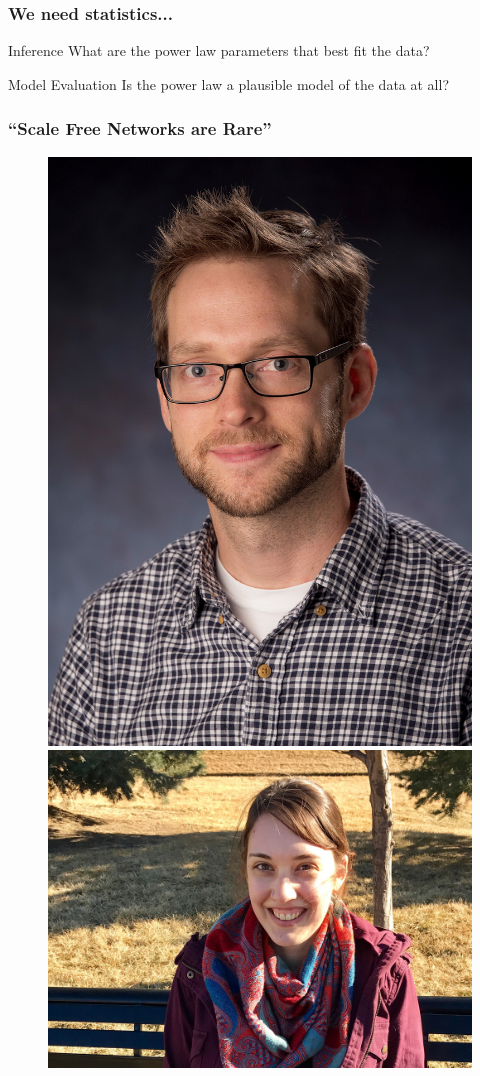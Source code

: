 \documentclass{beamer}
\begin{document}
		
		\begin{frame}\frametitle{We need statistics...}
		  	\begin{block}{Inference}
		  		What are the power law parameters that best fit the data? 
		  	\end{block}
		  	\begin{block}{Model Evaluation}
		  		Is the power law a plausible model of the data at all?
		  	\end{block}
		\end{frame}
	
		
		\begin{frame}\frametitle{``Scale Free Networks are Rare''}
		  	\begin{figure}
				\centering
				\includegraphics[width=.3\textwidth]{AaronClauset_1500}
				\includegraphics[width=.55\textwidth]{AnnaBroido}
			\end{figure}
		\end{frame}
	
\end{document}
